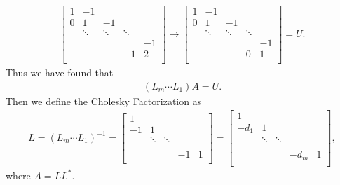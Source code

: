 \documentclass[12pt]{report}
\begin{document}
\begin{solution}
\begin{enumerate}
      \begin{align*}
        \begin{bmatrix} 1 & -1 \\ 0 & 1 &-1 \\
          & \ddots & \ddots & \ddots \\
          &&&& -1\\
          &&&-1& 2\\
        \end{bmatrix} \rightarrow 
        \begin{bmatrix} 
          1 & -1 \\ 
          0 & 1 &-1 \\
          & \ddots & \ddots & \ddots \\
          &&&& -1\\
          &&&0& 1\\
        \end{bmatrix} = U.
      \end{align*} 
      Thus we have found that
      \begin{align*}
        (L_{m} \cdots L_1) A = U.
      \end{align*}
      Then we define the Cholesky Factorization as 
      \begin{align*}
        L = (L_{m} \cdots L_1)^{-1} = \begin{bmatrix} 1 \\ -1 & 1 \\
          & \ddots & \ddots \\
          &&&&\\
          &&&-1& 1\\
        \end{bmatrix} = \begin{bmatrix} 
          1 \\ 
          -d_1 & 1 \\
          & \ddots & \ddots \\
          &&&&\\
          &&&-d_{m}& 1\\
        \end{bmatrix},
      \end{align*}
      where $A = LL^*$.


\end{enumerate}
\end{solution}
\end{document}
